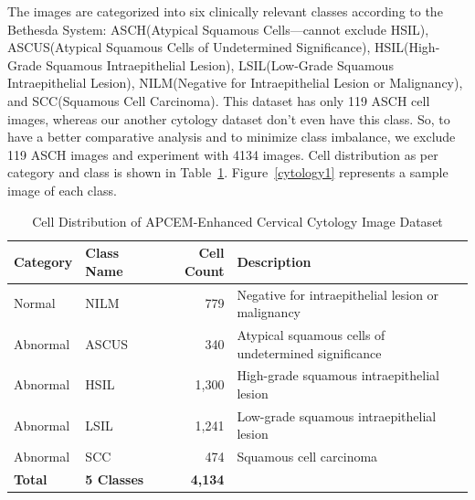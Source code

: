 \documentclass[pdflatex,sn-nature]{sn-jnl}%
\theoremstyle{thmstyleone}%
\theoremstyle{thmstyletwo}%
\theoremstyle{thmstylethree}%
\begin{document}
The images are categorized into six clinically relevant classes according to the Bethesda System: ASCH(Atypical Squamous Cells—cannot exclude HSIL), ASCUS(Atypical Squamous Cells of Undetermined Significance), HSIL(High-Grade Squamous Intraepithelial Lesion), LSIL(Low-Grade Squamous Intraepithelial Lesion), NILM(Negative for Intraepithelial Lesion or Malignancy), and SCC(Squamous Cell Carcinoma). This dataset has only 119 ASCH cell images, whereas our another cytology dataset don't even have this class. So, to have a better comparative analysis and to minimize class imbalance, we exclude 119 ASCH images and experiment with 4134 images.
Cell distribution as per category and class is shown in
Table~\ref{tab:cell_distribution_APCEM}. Figure~\ref{cytology1} represents a sample image of each class.

\begin{table}[htbp]
    \centering
    \caption{Cell Distribution of APCEM-Enhanced Cervical Cytology Image Dataset}
    \label{tab:cell_distribution_APCEM}
    \begin{tabular}{llrl}
        \toprule
        \textbf{Category} & \textbf{Class Name} & \textbf{Cell Count} & \textbf{Description} \\
        \midrule
        Normal   & NILM  & 779 & Negative for intraepithelial lesion or malignancy \\
        Abnormal & ASCUS & 340 & Atypical squamous cells of undetermined significance \\
        Abnormal & HSIL  & 1,300 & High-grade squamous intraepithelial lesion \\
        Abnormal & LSIL  & 1,241 & Low-grade squamous intraepithelial lesion \\
        Abnormal & SCC   & 474 & Squamous cell carcinoma \\
        \midrule
        \textbf{Total} & \textbf{5 Classes} & \textbf{4,134} & \\
        \bottomrule
    \end{tabular}
\end{table}
\end{document}
